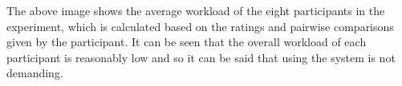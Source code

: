 The above image shows the average workload of the eight participants in the experiment, which is calculated based on the ratings and pairwise comparisons given by the participant. It can be seen that the overall workload of each participant is reasonably low and so it can be said that using the system is not demanding. 



%
